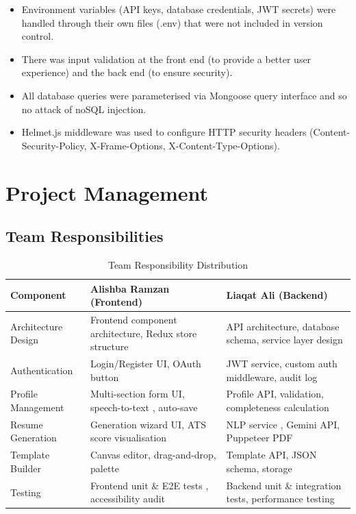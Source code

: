 \documentclass[12pt, a4paper, oneside]{report}
\begin{document}
\begin{itemize}
    \item Environment variables (API keys, database credentials, JWT secrets) were handled through their own files (.env) that were not included in version control.
    \item There was input validation at the front end (to provide a better user experience) and the back end (to ensure security).
    \item All database queries were parameterised via Mongoose query interface and so no attack of noSQL injection.
    \item Helmet.js middleware was used to configure HTTP security headers (Content-Security-Policy, X-Frame-Options, X-Content-Type-Options).
\end{itemize}

\section{Project Management}

\subsection{Team Responsibilities}

\begin{table}[H]
\centering
\caption{Team Responsibility Distribution}
\label{tab:team_responsibilities}
\renewcommand{\arraystretch}{1.5}
\begin{tabularx}{\textwidth}{|p{4cm}|X|X|}
\hline
\textbf{Component} & \textbf{Alishba Ramzan (Frontend)} & \textbf{Liaqat Ali (Backend)} \\
\hline
Architecture Design & Frontend component architecture, Redux store structure & API architecture, database schema, service layer design \\
\hline
Authentication & Login/Register UI, OAuth button & JWT service, custom auth middleware, audit log \\
\hline
Profile Management & Multi-section form UI, speech-to-text \cite{sears2003}, auto-save & Profile API, validation, completeness calculation \\
\hline
Resume Generation & Generation wizard UI, ATS score visualisation & NLP service \cite{gemini2023}, Gemini API, Puppeteer PDF \cite{puppeteer2024} \\
\hline
Template Builder & Canvas editor, drag-and-drop, palette & Template API, JSON schema, storage \\
\hline
Testing & Frontend unit \& E2E tests \cite{cypress2024}, accessibility audit \cite{wcag21} & Backend unit \& integration tests, performance testing \cite{k62024} \\
\hline
\end{tabularx}
\end{table}
\end{document}
